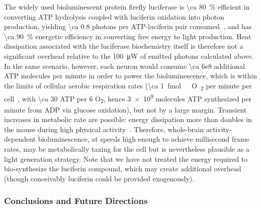 The widely used bioluminescent protein firefly luciferase is \SI{\ca 80}{\percent} efficient in converting ATP hydrolysis coupled with luciferin oxidation into photon production, yielding \num{\ca 0.8} photons per ATP-luciferin pair consumed~\cite{seliger60}, and has \SI{\ca 90}{\percent} energetic efficiency in converting free energy to light production.
Heat dissipation associated with the luciferase biochemistry itself is therefore not a significant overhead relative to the \SI{100}{\micro\watt} of emitted photons calculated above. 
In the same scenario, however, each neuron would consume \num{\ca 6e8} additional ATP molecules per minute in order to power the bioluminescence, which is within the limits of cellular aerobic respiration rates (\SI{\ca 1}{\femto\mole\ O\textsubscript{2}} per minute per cell~\cite{molter09}, with \num{\ca 30} ATP per 6 O\textsubscript{2}, hence \num{3e9} molecules ATP synthesized per minute from ADP via glucose oxidation), but not by a large margin.
Transient increases in metabolic rate are possible: energy dissipation more than doubles in the mouse during high physical activity~\cite{speakman13}.
Therefore, whole-brain activity-dependent bioluminescence, at speeds high enough to achieve millisecond frame rates, may be metabolically taxing for the cell but is nevertheless plausible as a light generation strategy. Note that we have not treated the energy required to bio-synthesize the luciferin compound, which may create additional overhead (though conceivably luciferin could be provided exogenously).

\subsubsection{Conclusions and Future Directions}

